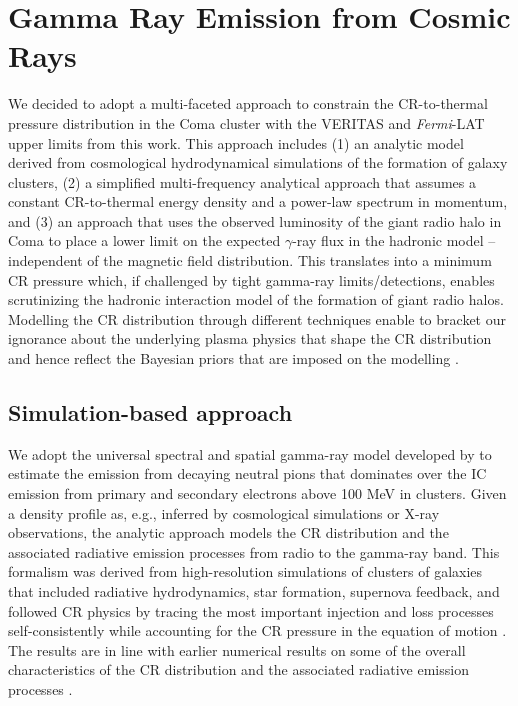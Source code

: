 \documentclass[12pt,manuscript]{aastex}
\begin{document}
\section{Gamma Ray Emission from Cosmic Rays}
We decided to adopt a multi-faceted approach to constrain the CR-to-thermal pressure distribution
in the Coma cluster with the VERITAS and \emph{Fermi}-LAT upper limits from this work. This
approach includes (1) an analytic model derived from cosmological hydrodynamical simulations of the
formation of galaxy clusters, (2) a simplified multi-frequency analytical approach that assumes a
constant CR-to-thermal energy density and a power-law spectrum in momentum, and (3) an approach
that uses the observed luminosity of the giant radio halo in Coma to place a lower limit on the
expected $\gamma$-ray flux in the hadronic model -- independent of the magnetic field distribution.
This translates into a minimum CR pressure which, if challenged by tight gamma-ray
limits/detections, enables scrutinizing the hadronic interaction model of the formation of giant
radio halos. Modelling the CR distribution through different techniques enable to bracket our
ignorance about the underlying plasma physics that shape the CR distribution and hence reflect the
Bayesian priors that are imposed on the modelling
\citep[see][for a discussion]{article:PinzkePfrommerBergstrom}.

%
%

\subsection{Simulation-based approach}
We adopt the universal spectral and spatial gamma-ray model developed by
\citet{article:PinzkePfrommer:2010} to estimate the emission from decaying neutral pions that
dominates over the IC emission from primary and secondary electrons above 100 MeV in clusters.
Given a density profile as, e.g., inferred by cosmological simulations or X-ray observations, the
analytic approach models the CR distribution and the associated radiative emission processes from
radio to the gamma-ray band. This formalism was derived from high-resolution simulations of
clusters of galaxies that included radiative hydrodynamics, star formation, supernova feedback, and
followed CR physics by tracing the most important injection and loss processes self-consistently
while accounting for the CR pressure in the equation of motion
\citep{article:PfrommerSpringelEnsslinJubelgas, article:EnsslinPfrommerSpringelJubelgas:2007,
article:JubelgasSpringelEnsslinPfrommer:2008}. The results are in line with earlier numerical
results on some of the overall characteristics of the CR distribution and the associated radiative
emission processes \citep{article:DolagEnsslin, article:MiniatiRyuKangJones:2001,
article:Miniati:2003, article:Pfrommer_etal:2007, article:PfrommerEnsslinSpringel:2008,
article:Pfrommer:2008}.
 
\end{document}
